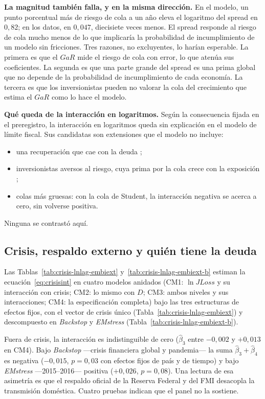 \textbf{La magnitud también falla, y en la misma dirección.} En el modelo, un punto porcentual más de riesgo de cola a un año eleva el logaritmo del spread en $0{,}82$; en los datos, en $0{,}047$, diecisiete veces menos. El spread responde al riesgo de cola mucho menos de lo que implicaría la probabilidad de incumplimiento de un modelo sin fricciones. Tres razones, no excluyentes, lo harían esperable. La primera es que el $GaR$ mide el riesgo de cola con error, lo que atenúa sus coeficientes. La segunda es que una parte grande del spread es una prima global que no depende de la probabilidad de incumplimiento de cada economía. La tercera es que los inversionistas pueden no valorar la cola del crecimiento que estima el $GaR$ como lo hace el modelo.

\textbf{Qué queda de la interacción en logaritmos.} Según la consecuencia fijada en el preregistro, la interacción en logaritmos queda sin explicación en el modelo de límite fiscal. Sus candidatas son extensiones que el modelo no incluye:
\begin{itemize}
    \item una recuperación que cae con la deuda \citep{Yue2010};
    \item inversionistas aversos al riesgo, cuya prima por la cola crece con la exposición \citep{Lizarazo2013};
    \item colas más gruesas: con la cola de Student, la interacción negativa se acerca a cero, sin volverse positiva.
\end{itemize}
Ninguna se contrastó aquí.

\subsection{Crisis, respaldo externo y quién tiene la deuda}
\label{sec:crisis-interaccion}

Las Tablas~\ref{tab:crisis-lnlag-embiext} y~\ref{tab:crisis-lnlag-embiext-b} estiman la ecuación~\eqref{eq:crisisint} en cuatro modelos anidados (CM1: $\ln JLoss$ y su interacción con crisis; CM2: lo mismo con $D$; CM3: ambos niveles y sus interacciones; CM4: la especificación completa) bajo las tres estructuras de efectos fijos, con el vector de crisis único (Tabla~\ref{tab:crisis-lnlag-embiext}) y descompuesto en \textit{Backstop} y \textit{EMstress} (Tabla~\ref{tab:crisis-lnlag-embiext-b}).



Fuera de crisis, la interacción es indistinguible de cero ($\hat\beta_3$ entre $-0{,}002$ y $+0{,}013$ en CM4). Bajo \textit{Backstop} ---crisis financiera global y pandemia--- la suma $\hat\beta_3+\hat\beta_4$ es negativa ($-0{,}015$, $p=0{,}03$ con efectos fijos de país y de tiempo) y bajo \textit{EMstress} ---2015--2016--- positiva ($+0{,}026$, $p=0{,}08$). Una lectura de esa asimetría es que el respaldo oficial de la Reserva Federal y del FMI desacopla la transmisión doméstica. Cuatro pruebas indican que el panel no la sostiene.

